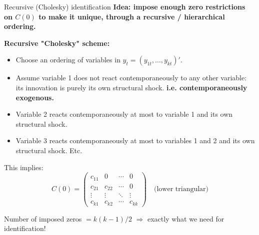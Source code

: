 \documentclass{beamer}
\begin{document}
\begin{frame}{Recursive (Cholesky) identification}
\textbf{Idea: impose enough \textbf{zero restrictions} on $C(0)$ to make it unique, through a recursive / hierarchical ordering.}
\footnotesize
\medskip

\textbf{Recursive "Cholesky" scheme:}
\begin{itemize}
  \item Choose an ordering of variables in $y_t = (y_{1t},\dots,y_{kt})'$.
  \item Assume variable 1 does not react contemporaneously to any other variable:
        its innovation is purely its own structural shock.\textbf{ i.e. contemporaneously exogenous.}
  \item Variable 2 reacts contemporaneously at most to variable 1 and its own structural shock.
  \item   Variable 3 reacts contemporaneously at most to variables 1 and 2 and its own structural shock. Etc.
\end{itemize}

This implies:
\[
C(0) =
\begin{pmatrix}
c_{11} & 0      & \cdots & 0 \\
c_{21} & c_{22} & \cdots & 0 \\
\vdots & \vdots & \ddots & \vdots \\
c_{k1} & c_{k2} & \cdots & c_{kk}
\end{pmatrix}
\quad\text{(lower triangular)}
\]

Number of imposed zeros $= k(k-1)/2$ $\Rightarrow$ exactly what we need for identification! 
\end{frame}
\end{document}
